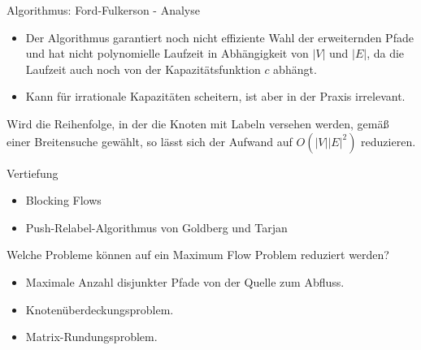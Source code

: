 \documentclass[aspectratio=169]{beamer}
\begin{document}
  \begin{frame}{Algorithmus: Ford-Fulkerson - Analyse}

  \begin{itemize}
    \item Der Algorithmus garantiert noch nicht effiziente Wahl der
    erweiternden Pfade und hat nicht polynomielle Laufzeit in Abhängigkeit von $|V|$ und $|E|$,
    da die Laufzeit auch noch von der Kapazitätsfunktion $c$ abhängt.
    \pause
    \item Kann für irrationale Kapazitäten scheitern, ist aber in der Praxis irrelevant.
  \end{itemize}

  \pause

  \begin{modifikation*}
    Wird die Reihenfolge, in der die Knoten mit Labeln versehen werden, gemäß
    einer Breitensuche gewählt, so lässt sich der Aufwand auf $O(|V||E|^2)$ reduzieren.
  \end{modifikation*}

  \end{frame}

  \begin{frame}{Vertiefung}

  \begin{algorithmen*}
  \begin{itemize}
    \item Blocking Flows
    \item Push-Relabel-Algorithmus von Goldberg und Tarjan
  \end{itemize}

  \end{algorithmen*}

  \pause

  \begin{anwendungen*}
    Welche Probleme können auf ein Maximum Flow Problem reduziert werden?
    \begin{itemize}
      \item Maximale Anzahl disjunkter Pfade von der Quelle zum Abfluss.
      \item Knotenüberdeckungsproblem.
      \item Matrix-Rundungsproblem.
    \end{itemize}

  \end{anwendungen*}

  \end{frame}
\end{document}

